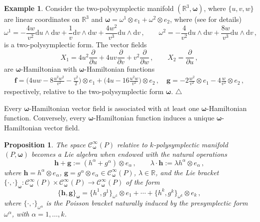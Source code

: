 \documentclass[11pt]{article}
\theoremstyle{plain}
\newtheorem{proposition}[theorem]{Proposition}
\theoremstyle{definition}
\newtheorem{example}[theorem]{Example}
\newcommand{\R}{\mathbb{R}}
\newcommand{\Cinfty}{\mathscr{C}^\infty}
\newcommand{\bomega}{{\boldsymbol{\omega}}}
\newcommand{\bh}{{\boldsymbol{h}}}
\renewcommand{\d}{\mathrm{d}}
\newcommand{\parder}[2]{\frac{\partial #1}{\partial #2}}
\def\d{\mathrm{d}}
\newcommand\xqed[1]{%
    \leavevmode\unskip\penalty9999 \hbox{}\nobreak\hfill
	\quad\hbox{#1}}
\newcommand\demo{\xqed{$\triangle$}}
\numberwithin{equation}{section}
\begin{document}
\begin{example}\label{ex1}
    Consider the two-polysymplectic manifold $(\R^3,\bomega)$, where $\{u,v,w\}$ are linear coordinates on $\R^3$ and $\bomega = \omega^1\otimes e_1 + \omega^2\otimes e_2$, where     (see \cite{LV_15} for details)
    $$
        \omega^1 =- \frac{4w}{v^2}\d u\wedge\d w + \frac{1}{v}\d v\wedge\d w + \frac{4w^2}{v^3}\d u\wedge\d v\,,\qquad \omega^2 = -\frac{4}{v^2}\d u\wedge\d w + \frac{8w}{v^3}\d u\wedge\d v\,,
    $$
    is a two-polysymplectic form. The vector fields
    $$
        X_1 = 4u^2\parder{}{u} + 4uv\parder{}{v} + v^2\parder{}{w}\,,\qquad X_2 = \parder{}{u}\,,%
    $$
    are $\bomega$-Hamiltonian with  $\bomega$-Hamiltonian functions
    \begin{gather}
        \boldsymbol{f} = \Big(4uw-8\displaystyle\frac{u^2w^2}{v^2}-\displaystyle\frac{v^2}{2}\Big)\otimes e_1 + \Big(4u-16\displaystyle\frac{u^2w}{v^2}\Big) \otimes e_2\,,\quad
        \boldsymbol{g} = -2\displaystyle\frac{w^2}{v^2}\otimes e_1-4\frac{w}{v^2}\otimes e_2\,,%
    \end{gather}
    respectively, relative to the two-polysymplectic form $\bomega$.\demo
\end{example}

   Every $\bomega$-Hamiltonian vector field is associated with at least one $\bomega$-Hamiltonian function. Conversely, every $\bomega$-Hamiltonian function induces a unique $\bomega$-Hamiltonian vector field.



\begin{proposition} The space $\Cinfty_\bomega(P)$ relative to $k$-polysymplectic manifold $(P,\bomega)$  becomes a Lie algebra when endowed with the natural operations
\begin{equation*}
\boldsymbol{h} + \boldsymbol{g}:=(h^\alpha + g^\alpha)\otimes e_\alpha\,,\qquad \lambda \cdot \bh:= \lambda h^\alpha\otimes e_\alpha\,,
\end{equation*}
where $\bh =  h^\alpha\otimes e_\alpha$, $\boldsymbol{g} = g^\alpha\otimes e_\alpha\in \Cinfty_\bomega(P)$, $\lambda\in\R$, and the Lie bracket $\{\cdot,\cdot\}_\bomega:\Cinfty_\bomega(P)\times \Cinfty_\bomega(P)\rightarrow \Cinfty_\bomega(P)$ of the form
\begin{equation}\label{LieB}
    \{\bh,\boldsymbol{g}\}_\bomega=\{h^1,g^1\}_{\omega^1}\otimes e_1 + \dotsb + \{h^k,g^k\}_{\omega^k}\otimes e_k\,,
\end{equation}
where $\{\cdot,\cdot\}_{\omega^\alpha}$ is the Poisson bracket naturally induced by the presymplectic form $\omega^\alpha$, with $\alpha=1,\ldots,k$.
\end{proposition}
\end{document}
